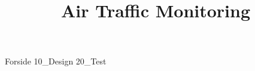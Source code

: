 \documentclass[a4paper,openany]{memoir}
\title{Air Traffic Monitoring}
\begin{document}
	{Forside}  \newpage
	\tableofcontents\thispagestyle{fancy}  \newpage
	{10_Design}  \newpage
	{20_Test} \newpage
\end{document}
